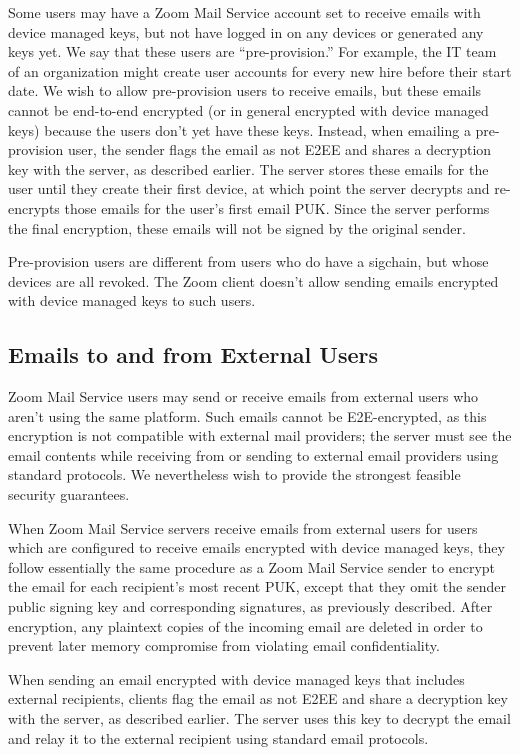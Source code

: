 Some users may have a Zoom Mail Service account set to receive emails with device managed keys, but
not have logged in on any devices or generated any keys yet. We say that these users are
``pre-provision.'' For example, the IT team of an organization might create user accounts for every
new hire before their start date. We wish to allow pre-provision users to receive emails, but these
emails cannot be end-to-end encrypted (or in general encrypted with device managed keys) because the
users don't yet have these keys. Instead, when emailing a pre-provision user, the sender flags the
email as not E2EE and shares a decryption key with the server, as described earlier. The server
stores these emails for the user until they create their first device, at which point the server
decrypts and re-encrypts those emails for the user's first email PUK. Since the server performs the
final encryption, these emails will not be signed by the original sender.

Pre-provision users are different from users who do have a sigchain, but whose devices are all
revoked. The Zoom client doesn't allow sending emails encrypted with device managed keys to such
users.

\subsection{Emails to and from External Users}
\label{sec:mailext}

Zoom Mail Service users may send or receive emails from external users who aren't using the same
platform. Such emails cannot be E2E-encrypted, as this encryption is not compatible with external
mail providers; the server must see the email contents while receiving from or sending to external
email providers using standard protocols. We nevertheless wish to provide the strongest feasible
security guarantees.

When Zoom Mail Service servers receive emails from external users for users which are configured to
receive emails encrypted with device managed keys, they follow essentially the same procedure as a
Zoom Mail Service sender to encrypt the email for each recipient's most recent PUK, except that they
omit the sender public signing key and corresponding signatures, as previously described. After
encryption, any plaintext copies of the incoming email are deleted in order to prevent later memory
compromise from violating email confidentiality.

When sending an email encrypted with device managed keys that includes external recipients, clients
flag the email as not E2EE and share a decryption key with the server, as described earlier. The
server uses this key to decrypt the email and relay it to the external recipient using standard
email protocols.

